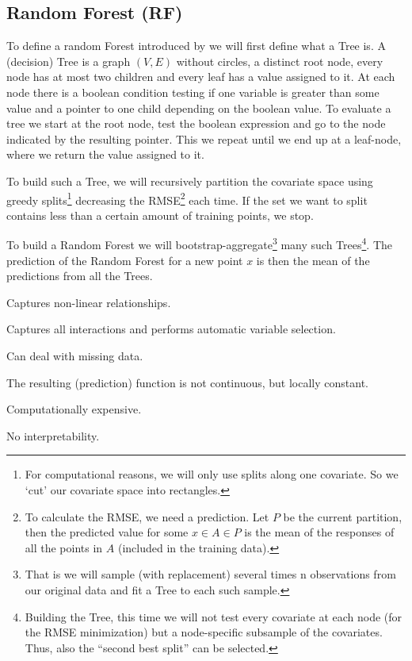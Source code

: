 \subsection{Random Forest (RF)}{\label{sec:corr_model_RF}
    To define a random Forest introduced by \cite{breimanRandomForests2001}  we will first define what a Tree is. A {(decision) Tree} is a graph $(V,E)$ without circles, a distinct root node, every node has at most two children and every leaf has a value assigned to it. At each node there is a boolean condition testing if one variable is greater than some value and a pointer to one child depending on the boolean value. To evaluate a tree we start at the root node, test the boolean expression and go to the node indicated by the resulting pointer. This we repeat until we end up at a leaf-node, where we return the value assigned to it. 
    
    To build such a Tree, we will recursively partition the covariate space using greedy splits\footnote{For computational reasons, we will only use splits along one covariate. So we `cut' our covariate space into rectangles.} decreasing the RMSE\footnote{To calculate the RMSE, we need a prediction. Let $P$ be the current partition, then the predicted value for some $x\in A \in P$ is the mean of the responses of all the points in $A$ (included in the training data).} each time. If the set we want to split contains less than a certain amount of training points, we stop.
    
    To build a {Random Forest} we will bootstrap-aggregate\footnote{That is we will sample (with replacement) several times n observations from our original data and fit a Tree to each such sample.} many such Trees\footnote{Building the Tree, this time we will not test every covariate at each node (for the RMSE minimization) but a node-specific subsample of the covariates. Thus, also the ``second best split'' can be selected.}. The prediction of the Random Forest for a new point $x$ is then the mean of the predictions from all the Trees. 
    \begin{my_pros_cons_table}{
        \item Captures non-linear relationships.
        \item Captures all interactions and performs automatic variable selection.
        \item Can deal with missing data.
    }{
        \item The resulting (prediction) function is not continuous, but locally constant.
        \item Computationally expensive.
        \item No interpretability.
    }
    \end{my_pros_cons_table}
}
